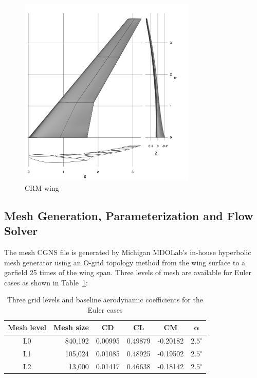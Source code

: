 \begin{figure}[tbp]
  \centering
  \includegraphics[clip,width=0.75\textwidth]{./figs/chap7_aso/CRM-wing.png}%
  \caption{CRM wing \label{fig:crm_wing}}
\end{figure}


\subsection{Mesh Generation, Parameterization and Flow Solver}
The mesh CGNS file is generated by Michigan MDOLab's in-house hyperbolic mesh generator using an O-grid topology method from the wing surface to a garfield 25 times of the wing span. Three levels of mesh are available for Euler cases as shown in Table~\ref{tab:euler_mesh}:

\begin{table}[H]
  \begin{center}
    \caption{Three grid levels and baseline aerodynamic coefficients for the Euler cases
    \label{tab:euler_mesh}}
  \begin{tabular}{ c r c c c c }
 \textbf{Mesh level}   &  \textbf{Mesh size}  & \textbf{CD} & \textbf{CL}  & \textbf{CM} & $\mathbf{\alpha}$  \\\hline
 L0                  &  840,192   & 0.00995   & 0.49879 & -0.20182  & $2.5^{\circ}$   \\
 L1                  &  105,024   & 0.01085   & 0.48925 & -0.19502    & $2.5^{\circ}$ \\
 L2 		      &   13,000    &  0.01417   & 0.46638    & -0.18142  &  	$2.5^{\circ}$ 	 
  \end{tabular}
  \end{center}
\end{table}


